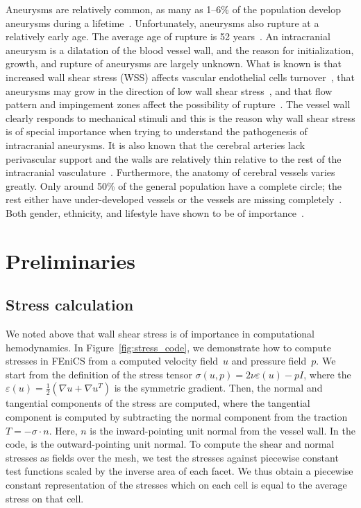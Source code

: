 Aneurysms are relatively common, as many as 1--6\% of the population
develop aneurysms during a lifetime~\cite{weir}. Unfortunately,
aneurysms also rupture at a relatively early age. The average age of
rupture is 52 years~\cite{humphrey}. An intracranial aneurysm is a
dilatation of the blood vessel wall, and the reason for
initialization, growth, and rupture of aneurysms are largely unknown.
What is known is that increased wall shear stress (WSS) affects
vascular endothelial cells turnover~\cite{davies}, that aneurysms may
grow in the direction of low wall shear stress~\cite{boussel}, and
that flow pattern and impingement zones affect the possibility of
rupture~\cite{cebral}. The vessel wall clearly responds to mechanical
stimuli and this is the reason why wall shear stress is of special
importance when trying to understand the pathogenesis of intracranial
aneurysms. It is also known that the cerebral arteries lack
perivascular support and the walls are relatively thin relative to the
rest of the intracranial vasculature~\cite{humphrey,Stehbens}.
Furthermore, the anatomy of cerebral vessels varies greatly. Only
around 50\% of the general population have a complete circle; the rest
either have under-developed vessels or the vessels are missing
completely~\cite{fung}. Both gender, ethnicity, and lifestyle have
shown to be of importance~\cite{Mhurchu,Longstreth,Kongable}.

\section{Preliminaries}

\subsection{Stress calculation}

We noted above that wall shear stress is of importance in
computational hemodynamics. In Figure~\ref{fig:stress_code}, we
demonstrate how to compute stresses in FEniCS from a computed velocity
field~$u$ and pressure field~$p$. We start from the definition of the
stress tensor $\sigma(u,p) = 2 \nu \varepsilon (u) - p I$, where the
$\varepsilon(u) = \frac{1}{2}(\nabla u + \nabla u^T)$ is the symmetric
gradient. Then, the normal and tangential components of the stress are
computed, where the tangential component is computed by subtracting
the normal component from the traction $T = -\sigma \cdot n$. Here,
$n$ is the inward-pointing unit normal from the vessel wall. In the
code,  is the outward-pointing unit normal. To compute the
shear and normal stresses as fields over the mesh, we test the
stresses against piecewise constant test functions scaled by the
inverse area of each facet. We thus obtain a piecewise constant
representation of the stresses which on each cell is equal to the
average stress on that cell.

